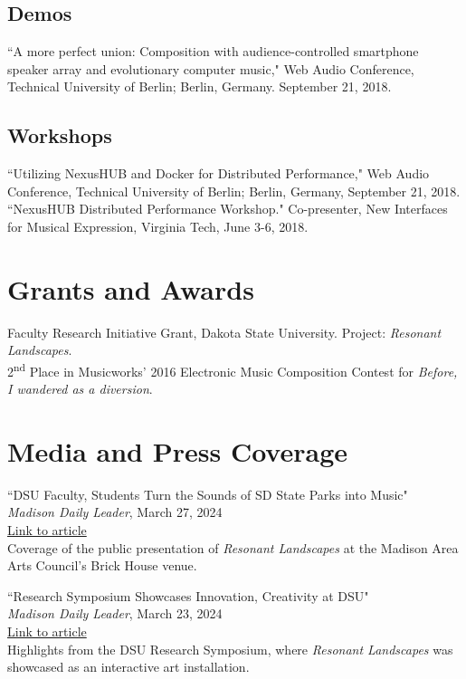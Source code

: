 \documentclass[12pt, a4paper]{article}
\newcommand{\years}[1]{\marginnote{\scriptsize #1}}
\begin{document}
\subsection*{Demos}
\years{2019} ``A more perfect union: Composition with audience-controlled smartphone speaker array and evolutionary computer music," Web Audio Conference, Technical University of Berlin; Berlin, Germany. September 21, 2018.

\subsection*{Workshops}
\years{2018} ``Utilizing NexusHUB and Docker for Distributed Performance," Web Audio Conference, Technical University of Berlin; Berlin, Germany, September 21, 2018. \\
``NexusHUB Distributed Performance Workshop." Co-presenter, New Interfaces for Musical Expression, Virginia Tech, June 3-6, 2018.



\section*{Grants and Awards}
\years{2023--24} Faculty Research Initiative Grant, Dakota State University. Project: \textit{Resonant Landscapes}. \\
\years{2016} 2\textsuperscript{nd} Place in Musicworks’ 2016 Electronic Music Composition Contest for \textit{Before, I wandered as a diversion}. 

\section*{Media and Press Coverage}

\years{2024} ``DSU Faculty, Students Turn the Sounds of SD State Parks into Music" \\
\textit{Madison Daily Leader}, March 27, 2024 \\
\href{https://www.madisondailyleader.com/news/local/article_c0bdd132-ec50-11ee-8049-a715d4e9b761.html}{Link to article} \\
Coverage of the public presentation of \textit{Resonant Landscapes} at the Madison Area Arts Council's Brick House venue.

\years{2024} ``Research Symposium Showcases Innovation, Creativity at DSU" \\
\textit{Madison Daily Leader}, March 23, 2024 \\
\href{https://www.madisondailyleader.com/news/local/article_455caa5e-e85e-11ee-8628-cf0c5c2b7152.html}{Link to article} \\
Highlights from the DSU Research Symposium, where \textit{Resonant Landscapes} was showcased as an interactive art installation.
\end{document}
